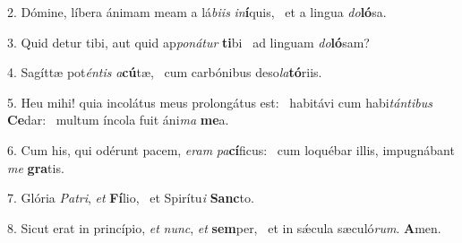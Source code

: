 2. Dómine, líbera ánimam meam a lá\textit{bi}\textit{is} \textit{in}\textbf{í}quis, \ast\  et a lingua \textit{do}\textbf{ló}sa.\

3. Quid detur tibi, aut quid ap\textit{po}\textit{ná}\textit{tur} \textbf{ti}bi \ast\  ad linguam \textit{do}\textbf{ló}sam?\

4. Sagíttæ pot\textit{én}\textit{tis} \textit{a}\textbf{cú}tæ, \ast\  cum carbónibus deso\textit{la}\textbf{tó}riis.\

5. Heu mihi! quia incolátus meus prolongátus est: \dag\  habitávi cum habi\textit{tán}\textit{ti}\textit{bus} \textbf{Ce}dar: \ast\  multum íncola fuit áni\textit{ma} \textbf{me}a.\

6. Cum his, qui odérunt pacem, \textit{e}\textit{ram} \textit{pa}\textbf{cí}ficus: \ast\  cum loquébar illis, impugnábant \textit{me} \textbf{gra}tis.\

7. Glória \textit{Pa}\textit{tri}, \textit{et} \textbf{Fí}lio, \ast\  et Spirítu\textit{i} \textbf{Sanc}to.\

8. Sicut erat in princípio, \textit{et} \textit{nunc}, \textit{et} \textbf{sem}per, \ast\  et in sǽcula sæculó\textit{rum}. \textbf{A}men.\

